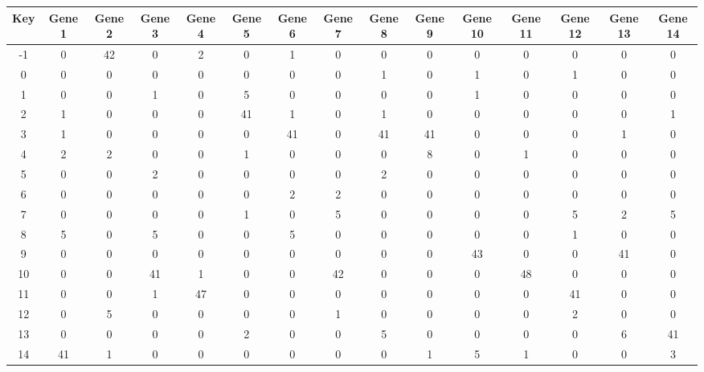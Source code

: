 \begin{tabular}{|c|c|c|c|c|c|c|c|c|c|c|c|c|c|c|}
\hline
Key & Gene 1 & Gene 2 & Gene 3 & Gene 4 & Gene 5 & Gene 6 & Gene 7 & Gene 8 & Gene 9 & Gene 10 & Gene 11 & Gene 12 & Gene 13 & Gene 14 \\
\hline
-1 & 0 & 42 & 0 & 2 & 0 & 1 & 0 & 0 & 0 & 0 & 0 & 0 & 0 & 0 \\
0 & 0 & 0 & 0 & 0 & 0 & 0 & 0 & 1 & 0 & 1 & 0 & 1 & 0 & 0 \\
1 & 0 & 0 & 1 & 0 & 5 & 0 & 0 & 0 & 0 & 1 & 0 & 0 & 0 & 0 \\
2 & 1 & 0 & 0 & 0 & 41 & 1 & 0 & 1 & 0 & 0 & 0 & 0 & 0 & 1 \\
3 & 1 & 0 & 0 & 0 & 0 & 41 & 0 & 41 & 41 & 0 & 0 & 0 & 1 & 0 \\
4 & 2 & 2 & 0 & 0 & 1 & 0 & 0 & 0 & 8 & 0 & 1 & 0 & 0 & 0 \\
5 & 0 & 0 & 2 & 0 & 0 & 0 & 0 & 2 & 0 & 0 & 0 & 0 & 0 & 0 \\
6 & 0 & 0 & 0 & 0 & 0 & 2 & 2 & 0 & 0 & 0 & 0 & 0 & 0 & 0 \\
7 & 0 & 0 & 0 & 0 & 1 & 0 & 5 & 0 & 0 & 0 & 0 & 5 & 2 & 5 \\
8 & 5 & 0 & 5 & 0 & 0 & 5 & 0 & 0 & 0 & 0 & 0 & 1 & 0 & 0 \\
9 & 0 & 0 & 0 & 0 & 0 & 0 & 0 & 0 & 0 & 43 & 0 & 0 & 41 & 0 \\
10 & 0 & 0 & 41 & 1 & 0 & 0 & 42 & 0 & 0 & 0 & 48 & 0 & 0 & 0 \\
11 & 0 & 0 & 1 & 47 & 0 & 0 & 0 & 0 & 0 & 0 & 0 & 41 & 0 & 0 \\
12 & 0 & 5 & 0 & 0 & 0 & 0 & 1 & 0 & 0 & 0 & 0 & 2 & 0 & 0 \\
13 & 0 & 0 & 0 & 0 & 2 & 0 & 0 & 5 & 0 & 0 & 0 & 0 & 6 & 41 \\
14 & 41 & 1 & 0 & 0 & 0 & 0 & 0 & 0 & 1 & 5 & 1 & 0 & 0 & 3 \\
\hline
\end{tabular}